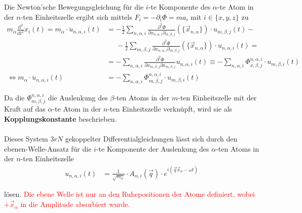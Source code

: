 \documentclass{article}
\newcommand{\diff}{\mathrm{d}}
\begin{document}
{	Die Newton'sche Bewegungsgleichung für die $i$-te Komponente des $\alpha$-te Atom in der $n$-ten Einheitszelle ergibt sich mittels $F_i = -\partial_i\Phi = m a_i$ mit $i \in \{x,y,z\}$ zu
		\begin{align*}
			m_\alpha \frac{\diff^2}{\diff t^2} x_i(t) = m_\alpha \cdot \ddot{u}_{n,\alpha,i}(t) &= - \frac{1}{2} \sum_{n,\alpha,i} \frac{\partial^2\Phi}{\partial x_{n,\alpha,i} \partial_{m,\beta,j}} (\{\vec{x}_{n,\alpha}\}) \cdot u_{m,\beta,j}(t) - \\
			&\phantom{=} - \frac{1}{2} \sum_{m,\beta,j} \frac{\partial^2\Phi}{\partial x_{n,\alpha,i} \partial_{m,\beta,j}} (\{\vec{x}_{n,\alpha}\}) \cdot u_{n,\alpha,i}(t) = \\
			&= -\sum_{n,\alpha,i} \frac{\partial^2\Phi}{\partial x_{m,\beta,j} \partial x_{m,\beta,j}} u_{n,\alpha,i}(t) \equiv -\sum_{n,\alpha,i} \Phi_{x,\beta,j}^{n,\alpha,i} \cdot u_{m,\beta,i}(t) \\
			\Leftrightarrow m_\alpha \cdot \ddot{u}_{n,\alpha,i}(t) &= -\sum_{n,\alpha,i} \Phi_{m,\beta,j}^{n,\alpha,i} \cdot u_{m,\beta,i}(t)
		\end{align*}
	
	Da die $\Phi_{m,\beta,j}^{n,\alpha,i}$ die Auslenkung des $\beta$-ten Atoms in der $m$-ten Einheitszelle mit der Kraft auf das $\alpha$-te Atom in der $n$-ten Einheitszelle verknüpft, wird sie als \textbf{Kopplungskonstante} beschrieben.\\
	\\
	Dieses System $3rN$ gekoppelter Differentialgleichungen lässt sich durch den ebenen-Welle-Ansatz für die $i$-te Komponente der Auslenkung des $\alpha$-ten Atoms in der $n$-ten Einheitszelle
		\begin{align*}
			u_{n,\alpha,i}(t) &= \frac{1}{\sqrt{m_\alpha}} \cdot A_{\alpha,i}(\vec{q}) \cdot e^{i(\vec{q}\vec{x}_n - \omega t)}
		\end{align*}
	
	lösen. \textcolor{red}{Die ebene Welle ist nur an den Ruhepositionen der Atome definiert, wobei $+\vec{x}_\alpha$ in die Amplitude absorbiert wurde.}


}
\end{document}

